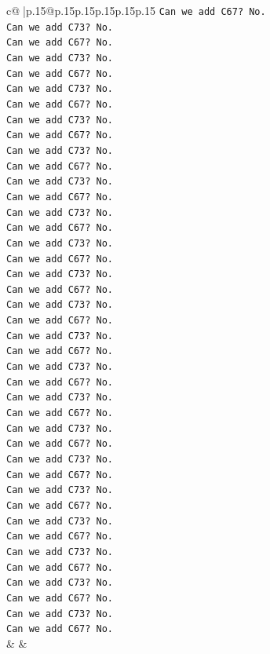 \documentclass{article}
\begin{document}
{\begin{supertabular}{c@{$\;$}|p{.15\linewidth}@{}p{.15\linewidth}p{.15\linewidth}p{.15\linewidth}p{.15\linewidth}p{.15\linewidth}}
{{{\texttt{Can we add C67? No.} \\
\texttt{Can we add C73? No.} \\
\texttt{Can we add C67? No.} \\
\texttt{Can we add C73? No.} \\
\texttt{Can we add C67? No.} \\
\texttt{Can we add C73? No.} \\
\texttt{Can we add C67? No.} \\
\texttt{Can we add C73? No.} \\
\texttt{Can we add C67? No.} \\
\texttt{Can we add C73? No.} \\
\texttt{Can we add C67? No.} \\
\texttt{Can we add C73? No.} \\
\texttt{Can we add C67? No.} \\
\texttt{Can we add C73? No.} \\
\texttt{Can we add C67? No.} \\
\texttt{Can we add C73? No.} \\
\texttt{Can we add C67? No.} \\
\texttt{Can we add C73? No.} \\
\texttt{Can we add C67? No.} \\
\texttt{Can we add C73? No.} \\
\texttt{Can we add C67? No.} \\
\texttt{Can we add C73? No.} \\
\texttt{Can we add C67? No.} \\
\texttt{Can we add C73? No.} \\
\texttt{Can we add C67? No.} \\
\texttt{Can we add C73? No.} \\
\texttt{Can we add C67? No.} \\
\texttt{Can we add C73? No.} \\
\texttt{Can we add C67? No.} \\
\texttt{Can we add C73? No.} \\
\texttt{Can we add C67? No.} \\
\texttt{Can we add C73? No.} \\
\texttt{Can we add C67? No.} \\
\texttt{Can we add C73? No.} \\
\texttt{Can we add C67? No.} \\
\texttt{Can we add C73? No.} \\
\texttt{Can we add C67? No.} \\
\texttt{Can we add C73? No.} \\
\texttt{Can we add C67? No.} \\
\texttt{Can we add C73? No.} \\
\texttt{Can we add C67? No.} \\
            }
        }
    }
    & & \\ \\


\end{supertabular}}
\end{document}

